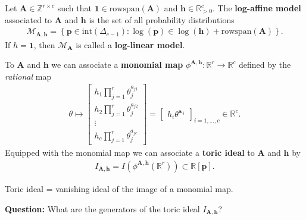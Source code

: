 \begin{mdframed}
\begin{defi}
  Let \( \mathbf A \in \mathbb{Z}^{r \times c} \) such that \( \mathbf 1 \in \mathrm{rowspan}(\mathbf A) \) and \( \mathbf h \in \mathbb R^{c}_{> 0} \). The \textbf{log-affine model} associated to \( \mathbf A \) and \( \mathbf h \) is the set of all probability distributions 
  \begin{align*}
    \mathcal{M}_{\mathbf A, \mathbf h} = \left\{ \mathbf p \in \mathrm{int}(\Delta_{c - 1}) : \log(\mathbf p) \in \log(\mathbf h) + \mathrm{rowspan}(\mathbf A) \right\}.
  \end{align*}
  If \( h = \mathbf 1 \), then \( \mathcal{M}_{\mathbf A} \) is called a \textbf{log-linear model}.
\end{defi}
\end{mdframed}

To \( \mathbf A \) and \( \mathbf h \) we can associate a \textbf{monomial map} \( \phi^{\mathbf A, \mathbf h}: \mathbb R^r \to \mathbb R^c \) defined by the \emph{rational} map
\begin{align*}
   \theta \mapsto \begin{bmatrix}
    h_1 \prod^r_{j=1}\theta_{j}^{a_{j1}} \\
    h_2 \prod^r_{j=1}\theta_{j}^{a_{j2}} \\
    \vdots \\
    h_c \prod^r_{j=1}\theta_{j}^{a_{jc}}
  \end{bmatrix} = \begin{bmatrix}
    h_i \theta^{\mathbf a_{\cdot i}}
  \end{bmatrix}_{i=1, \dots, c} \in \mathbb R^c.
\end{align*}
Equipped with the monomial map we can associate a \textbf{toric ideal} to \( \mathbf A \) and \( \mathbf h \) by 
\begin{align*}
  I_{\mathbf A, \mathbf h} = I\left( \phi^{\mathbf A, \mathbf h}(\mathbb R^r) \right) \subset \mathbb R[\mathbf p].
\end{align*}

\begin{mdframed}
\begin{center}
  Toric ideal = vanishing ideal of the image of a monomial map.
\end{center}
\end{mdframed}

\textbf{Question:} What are the generators of the toric ideal \( I_{\mathbf A, \mathbf h} \)?

